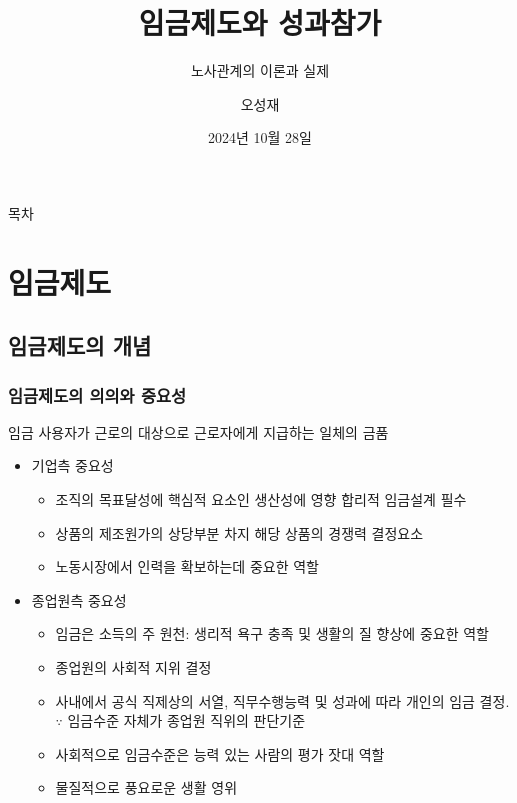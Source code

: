 \documentclass[aspectratio=169,xcolor=dvipsnames,handout]{beamer}
\title{임금제도와 성과참가}
\subtitle{노사관계의 이론과 실제}
\author{오성재}
\institute[CNU]
{\relax
    충남대학교 경제학과\
    }
\date{2024년 10월 28일}
\begin{document}

\frame{\titlepage}

\begin{frame}{목차}
    \small
    \tableofcontents[hideallsubsections]
\end{frame}

\section{임금제도}
\subsection{임금제도의 개념}

\begin{frame}[allowframebreaks]
    \frametitle{임금제도의 의의와 중요성}
    \begin{block}{임금}
        사용자가 근로의 대상으로 근로자에게 지급하는 일체의 금품
    \end{block}
    \begin{itemize}[<+->]
        \item 기업측 중요성
        \begin{itemize}[<+->]
            \item 조직의 목표달성에 핵심적 요소인 생산성에 영향 합리적 임금설계 필수
            \item 상품의 제조원가의 상당부분 차지 해당 상품의 경쟁력 결정요소
            \item 노동시장에서 인력을 확보하는데 중요한 역할
        \end{itemize}
        \framebreak%
        \item 종업원측 중요성
        \begin{itemize}[<+->]
            \item 임금은 소득의 주 원천: 생리적 욕구 충족 및 생활의 질 향상에 중요한 역할
            \item 종업원의 사회적 지위 결정
            \item 사내에서 공식 직제상의 서열, 직무수행능력 및 성과에 따라 개인의 임금 결정. $\because$ 임금수준 자체가 종업원 직위의 판단기준
            \item 사회적으로 임금수준은 능력 있는 사람의 평가 잣대 역할
            \item 물질적으로 풍요로운 생활 영위
        \end{itemize}
    \end{itemize}
\end{frame}
\end{document}
